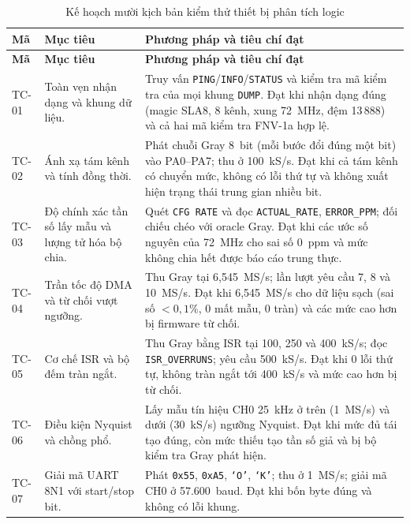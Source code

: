 \begin{longtable}[]{@{}|
  >{\raggedright\arraybackslash}p{}
  |>{\raggedright\arraybackslash}p{}
  |>{\raggedright\arraybackslash}p{}|@{}}
\caption{Kế hoạch mười kịch bản kiểm thử thiết bị phân tích logic}\label{tab:test-plan}\tabularnewline
\hline
\textbf{Mã} & \textbf{Mục tiêu} & \textbf{Phương pháp và tiêu chí đạt} \\ \hline
\endfirsthead
\hline
\textbf{Mã} & \textbf{Mục tiêu} & \textbf{Phương pháp và tiêu chí đạt} \\ \hline
\endhead
\endlastfoot

TC-01 & Toàn vẹn nhận dạng và khung dữ liệu. & Truy vấn \texttt{PING}/\texttt{INFO}/\texttt{STATUS} và kiểm tra mã kiểm tra của mọi khung \texttt{DUMP}. Đạt khi nhận dạng đúng (magic SLA8, 8 kênh, xung 72~MHz, đệm 13\,888) và cả hai mã kiểm tra FNV-1a hợp lệ. \\ \hline
TC-02 & Ánh xạ tám kênh và tính đồng thời. & Phát chuỗi Gray 8~bit (mỗi bước đổi đúng một bit) vào PA0--PA7; thu ở 100~kS/s. Đạt khi cả tám kênh có chuyển mức, không có lỗi thứ tự và không xuất hiện trạng thái trung gian nhiều bit. \\ \hline
TC-03 & Độ chính xác tần số lấy mẫu và lượng tử hóa bộ chia. & Quét \texttt{CFG RATE} và đọc \texttt{ACTUAL\_RATE}, \texttt{ERROR\_PPM}; đối chiếu chéo với oracle Gray. Đạt khi các ước số nguyên của 72~MHz cho sai số 0~ppm và mức không chia hết được báo cáo trung thực. \\ \hline
TC-04 & Trần tốc độ DMA và từ chối vượt ngưỡng. & Thu Gray tại 6,545~MS/s; lần lượt yêu cầu 7, 8 và 10~MS/s. Đạt khi 6,545~MS/s cho dữ liệu sạch (sai số $<0{,}1\%$, 0 mất mẫu, 0 tràn) và các mức cao hơn bị firmware từ chối. \\ \hline
TC-05 & Cơ chế ISR và bộ đếm tràn ngắt. & Thu Gray bằng ISR tại 100, 250 và 400~kS/s; đọc \texttt{ISR\_OVERRUNS}; yêu cầu 500~kS/s. Đạt khi 0 lỗi thứ tự, không tràn ngắt tới 400~kS/s và mức cao hơn bị từ chối. \\ \hline
TC-06 & Điều kiện Nyquist và chồng phổ. & Lấy mẫu tín hiệu CH0 25~kHz ở trên (1~MS/s) và dưới (30~kS/s) ngưỡng Nyquist. Đạt khi mức đủ tái tạo đúng, còn mức thiếu tạo tần số giả và bị bộ kiểm tra Gray phát hiện. \\ \hline
TC-07 & Giải mã UART 8N1 với start/stop bit. & Phát \texttt{0x55}, \texttt{0xA5}, \texttt{`O'}, \texttt{`K'}; thu ở 1~MS/s; giải mã CH0 ở 57.600~baud. Đạt khi bốn byte đúng và không có lỗi khung. \\ \hline

\end{longtable}
